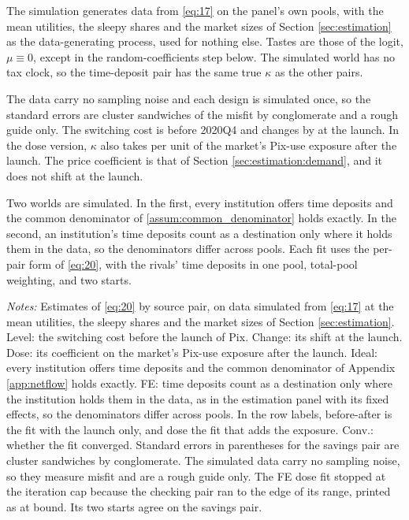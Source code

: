 The simulation generates data from \eqref{eq:17} on the panel's own pools, with the mean utilities, the sleepy shares and the market sizes of Section \ref{sec:estimation} as the data-generating process, used for nothing else. Tastes are those of the logit, $\mu\equiv0$, except in the random-coefficients step below. The simulated world has no tax clock, so the time-deposit pair has the same true $\kappa$ as the other pairs.

The data carry no sampling noise and each design is simulated once, so the standard errors are cluster sandwiches of the misfit by conglomerate and a rough guide only. The switching cost is  before 2020Q4 and changes by  at the launch. In the dose version, $\kappa$ also takes  per unit of the market's Pix-use exposure after the launch. The price coefficient is that of Section \ref{sec:estimation:demand}, and it does not shift at the launch.

Two worlds are simulated. In the first, every institution offers time deposits and the common denominator of \ref{assum:common_denominator} holds exactly. In the second, an institution's time deposits count as a destination only where it holds them in the data, so the denominators differ across pools. Each fit uses the per-pair form of \eqref{eq:20}, with the rivals' time deposits in one pool, total-pool weighting, and two starts.

\begin{table}[H]
	\centering
	\begin{threeparttable}
		\caption{Recovery of the Switching Cost by Source Pair in Simulated Data}\label{tab:k2b_pairs}
		
		\begin{tablenotes}[flushleft]
			\item \footnotesize \textit{Notes:} Estimates of \eqref{eq:20} by source pair, on data simulated from \eqref{eq:17} at the mean utilities, the sleepy shares and the market sizes of Section \ref{sec:estimation}. Level: the switching cost before the launch of Pix. Change: its shift at the launch. Dose: its coefficient on the market's Pix-use exposure after the launch. Ideal: every institution offers time deposits and the common denominator of Appendix \ref{app:netflow} holds exactly. FE: time deposits count as a destination only where the institution holds them in the data, as in the estimation panel with its fixed effects, so the denominators differ across pools. In the row labels, before-after is the fit with the launch only, and dose the fit that adds the exposure. Conv.: whether the fit converged. Standard errors in parentheses for the savings pair are cluster sandwiches by conglomerate. The simulated data carry no sampling noise, so they measure misfit and are a rough guide only. The FE dose fit stopped at the iteration cap because the checking pair ran to the edge of its range, printed as at bound. Its two starts agree on the savings pair.
		\end{tablenotes}
	\end{threeparttable}
\end{table}

